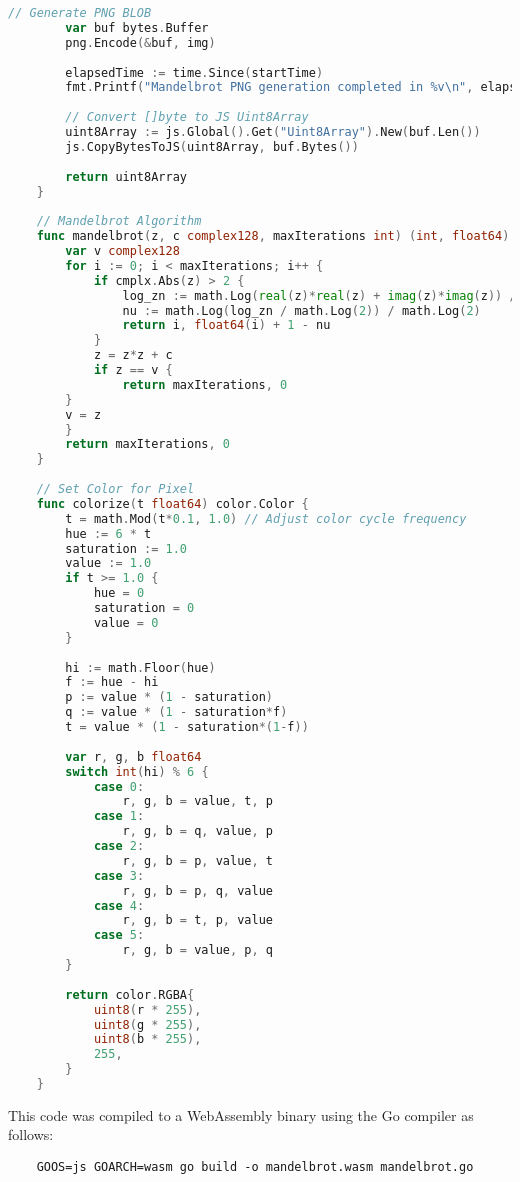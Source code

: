\begin{lstlisting}[language=go, frame=tb, caption={Mandelbrot Set Calculation: Go (WASM build)}]
        // Generate PNG BLOB
        var buf bytes.Buffer
        png.Encode(&buf, img)
    
        elapsedTime := time.Since(startTime)
        fmt.Printf("Mandelbrot PNG generation completed in %v\n", elapsedTime)
    
        // Convert []byte to JS Uint8Array
        uint8Array := js.Global().Get("Uint8Array").New(buf.Len())
        js.CopyBytesToJS(uint8Array, buf.Bytes())
    
        return uint8Array
    }
    
    // Mandelbrot Algorithm
    func mandelbrot(z, c complex128, maxIterations int) (int, float64) {
        var v complex128
        for i := 0; i < maxIterations; i++ {
            if cmplx.Abs(z) > 2 {
                log_zn := math.Log(real(z)*real(z) + imag(z)*imag(z)) / 2
                nu := math.Log(log_zn / math.Log(2)) / math.Log(2)
                return i, float64(i) + 1 - nu
            }
            z = z*z + c
            if z == v {
                return maxIterations, 0
        }
        v = z
        }
        return maxIterations, 0
    }
    
    // Set Color for Pixel
    func colorize(t float64) color.Color {
        t = math.Mod(t*0.1, 1.0) // Adjust color cycle frequency
        hue := 6 * t
        saturation := 1.0
        value := 1.0
        if t >= 1.0 {
            hue = 0
            saturation = 0
            value = 0
        }
    
        hi := math.Floor(hue)
        f := hue - hi
        p := value * (1 - saturation)
        q := value * (1 - saturation*f)
        t = value * (1 - saturation*(1-f))
    
        var r, g, b float64
        switch int(hi) % 6 {
            case 0:
                r, g, b = value, t, p
            case 1:
                r, g, b = q, value, p
            case 2:
                r, g, b = p, value, t
            case 3:
                r, g, b = p, q, value
            case 4:
                r, g, b = t, p, value
            case 5:
                r, g, b = value, p, q
        }
    
        return color.RGBA{
            uint8(r * 255),
            uint8(g * 255),
            uint8(b * 255),
            255,
        }
    }    
\end{lstlisting}

This code was compiled to a WebAssembly binary using the Go \cite{methodology:go} compiler as follows:
\begin{lstlisting}
    GOOS=js GOARCH=wasm go build -o mandelbrot.wasm mandelbrot.go
\end{lstlisting}


